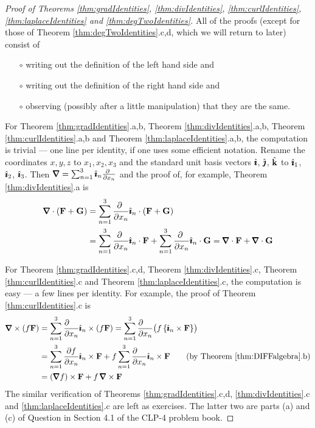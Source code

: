 \begin{proof}[Proof of Theorems \ref{thm:gradIdentities},
                        \ref{thm:divIdentities},
                        \ref{thm:curlIdentities},
                        \ref{thm:laplaceIdentities} and
                        \ref{thm:degTwoIdentities}]
All of the proofs (except for those of Theorem \ref{thm:degTwoIdentities}.c,d, 
which we will return to later)
consist of 
\begin{itemize}\itemsep1pt \parskip0pt  %
\item[$\circ$]
writing out the definition of the left hand side and
\item[$\circ$]
writing out the definition of the right hand side and
\item[$\circ$]
observing (possibly after a little manipulation) that they are the same.
\end{itemize}
For Theorem \ref{thm:gradIdentities}.a,b,
    Theorem \ref{thm:divIdentities}.a,b,
    Theorem \ref{thm:curlIdentities}.a,b and
    Theorem \ref{thm:laplaceIdentities}.a,b,
the computation is trivial --- one line per identity,
if one uses some efficient notation. Rename the coordinates $x,y,z$
to $x_1,x_2,x_3$ and the standard unit basis vectors $\hat{\pmb{\imath}}$, $\hat{\pmb{\jmath}}$, $\hat{\mathbf{k}}$
to $\hat{\pmb{\imath}}_1$, $\hat{\pmb{\imath}}_2$, $\hat{\pmb{\imath}}_3$. Then 
$\vnabla = \sum_{n=1}^3\hi_n\frac{\partial\ }{\partial x_n}$ and
the proof of, for example, Theorem \ref{thm:divIdentities}.a is
\begin{align*}
\vnabla\cdot(\vF+\vG)
&=\sum_{n=1}^3\frac{\partial\ }{\partial x_n} \hi_n\cdot(\vF+\vG) \\
&=\sum_{n=1}^3\frac{\partial\ }{\partial x_n} \hi_n\cdot\vF
+\sum_{n=1}^3\frac{\partial\ }{\partial x_n} \hi_n\cdot\vG
=\vnabla\cdot\vF+\vnabla \cdot\vG
\end{align*}

\bigskip
\noindent 
For Theorem \ref{thm:gradIdentities}.c,d,
     Theorem \ref{thm:divIdentities}.c,
     Theorem \ref{thm:curlIdentities}.c and
     Theorem \ref{thm:laplaceIdentities}.c, 
the computation is easy --- a few lines per identity.
For example, the proof of Theorem \ref{thm:curlIdentities}.c is
\begin{align*}
\vnabla\times(f\vF)
&=\sum_{n=1}^3\frac{\partial\hfill}{\partial x_n}\hi_n\times(f \vF)
=\sum_{n=1}^3\frac{\partial\hfill}{\partial x_n}\big(f\, \{\hi_n\times\vF\}\big)
\\
&=\sum_{n=1}^3\frac{\partial f}{\partial x_n}\hi_n\times\vF
+f\sum_{n=1}^3\frac{\partial\hfill}{\partial x_n}\hi_n\times\vF 
\qquad\text{(by Theorem \ref{thm:DIFFalgebra}.b)}\\
&=(\vnabla f)\times\vF + f\,\vnabla\times\vF
\end{align*}
The similar verification of Theorems \ref{thm:gradIdentities}.c,d,
      \ref{thm:divIdentities}.c and
      \ref{thm:laplaceIdentities}.c
are left as exercises. The latter two are parts (a) and (c) of 
Question  in Section 4.1 of the CLP-4 problem book.


\end{proof}
